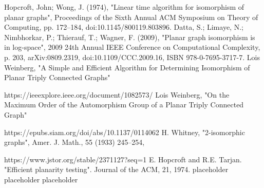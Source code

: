 \begin{thebibliography}{99}
     Hopcroft, John; Wong, J. (1974), 
    "Linear time algorithm for isomorphism of planar graphs", 
    Proceedings of the Sixth Annual ACM Symposium on Theory of Computing, 
    pp. 172–184, doi:10.1145/800119.803896.
     Datta, S.; Limaye, N.; Nimbhorkar, P.; Thierauf, T.; Wagner, F. (2009), 
    "Planar graph isomorphism is in log-space", 
    2009 24th Annual IEEE Conference on Computational Complexity, 
    p. 203, arXiv:0809.2319, doi:10.1109/CCC.2009.16, ISBN 978-0-7695-3717-7.
     Lois Weinberg,
    "A Simple and Efficient Algorithm for Determining Isomorphism  of Planar Triply Connected Graphs"
    
    https://ieeexplore.ieee.org/document/1082573/
     Lois Weinberg,
    "On the Maximum Order of the Automorphism Group of a Planar Triply Connected Graph"
    
    https://epubs.siam.org/doi/abs/10.1137/0114062
      H. Whitney, 
    "2-isomorphic graphs",  
    Amer. J. Math., 55 (1933) 245–254, 

    https://www.jstor.org/stable/2371127?seq=1
     E. Hopcroft and R.E. Tarjan. 
    "Efficient planarity testing".
    Journal of the ACM, 21, 1974.
    \bibitem{} placeholder
    \bibitem{} placeholder
    \bibitem{} placeholder
\end{thebibliography}